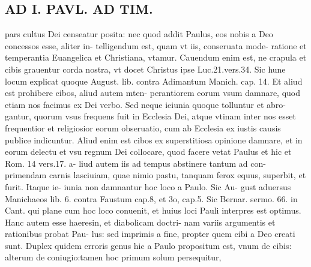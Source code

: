 \documentclass{article}
\begin{document}
\begin{pages}
\section*{AD I. PAVL. AD TIM. }
\marginpar{[ p.180 ]}\pstart pars cultus Dei censeatur posita: nec quod addit Paulus, eos nobis a Deo concessos esse, aliter in- telligendum est, quam vt iis, conseruata mode- ratione et temperantia Euangelica et Christiana, vtamur. Cauendum enim est, ne crapula et cibis grauentur corda nostra, vt docet Christus ipse Luc.21.vers.34. Sic hune locum explicat quoque August. lib.  contra Adimantum Manich. cap. 14. Et aliud est prohibere cibos, aliud autem mten- perantiorem eorum vsum damnare, quod etiam nos facimus ex Dei verbo. Sed neque ieiunia quoque tolluntur et abro- gantur, quorum vsus frequens fuit in Ecclesia Dei, atque vtinam inter nos esset frequentior et religiosior eorum obseruatio, cum ab Ecclesia ex iustis causis publice indicuntur. Aliud enim est cibos ex superstitiosa opinione damnare, et in eorum delectu et vsu regnum Dei collocare, quod facere vetat Paulus et hic et Rom. 14 vers.17. a- liud autem iis ad tempus abstinere tantum ad con- primendam carnis lasciuiam, quae nimio pastu, tanquam ferox equus, superbit, et furit. Itaque ie- iunia non damnantur hoc loco a Paulo. Sic Au- gust aduersus Manichaeos lib. 6. contra Faustum cap.8, et 3o, cap.5. Sic Bernar. sermo. 66. in Cant. qui plane cum hoc loco conuenit, et huius loci Pauli interpres est optimus. Hanc autem esse haeresin, et diabolicam doctri- nam variis argumentis et rationibus probat Pau- lus: sed imprimis a fine, propter quem cibi a Deo creati sunt. Duplex quidem erroris genus hic a Paulo propositum est, vnum de cibis: alterum de coniugio:tamen hoc primum solum persequitur,  \pend

\end{pages}
\end{document}
